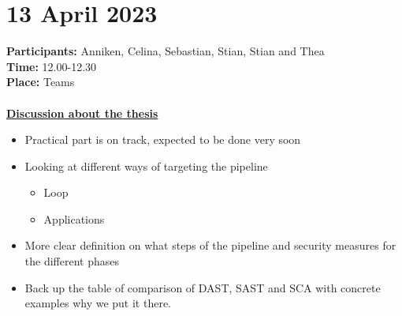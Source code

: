 \section{13 April 2023}
\textbf{Participants:} Anniken, Celina, Sebastian, Stian, Stian and Thea \\
\textbf{Time:} 12.00-12.30 \\
\textbf{Place:} Teams
\\~\\
\textbf{\underline{Discussion about the thesis}}
\begin{itemize}
    \item Practical part is on track, expected to be done very soon
    \item Looking at different ways of targeting the pipeline 
        \begin{itemize}
            \item Loop
            \item Applications
        \end{itemize}
    \item More clear definition on what steps of the pipeline and security measures for the different phases
    \item Back up the table of comparison of DAST, SAST and SCA with concrete examples why we put it there. 
\end{itemize}